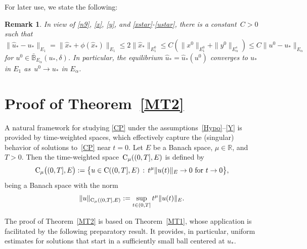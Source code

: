 \documentclass[reqno,11pt]{amsart}
\numberwithin{equation}{section}
\newcommand{\R}{\mathbb{R}}
\newtheorem{rem}[thm]{Remark}
\theoremstyle{remark}
\begin{document}
For later use, we state the  following:



 \begin{rem}\label{R2} In view of  \eqref{n9}, \eqref{x},  \eqref{y}, and \eqref{xstar}-\eqref{ustar},  there is a constant~$C>0$ such that
 \begin{equation*}
 \|\hat u_*-u_*\|_{E_1}=\|\hat x_*+\phi(\hat x_*)\|_{E_1}\leq 2\|\hat x_*\|_{E_1^0}\leq C(\|x^0\|_{E_1^0}+\|y^0\|_{E_\alpha^s}) \leq C\|u^0-u_*\|_{E_\alpha}
 \end{equation*}
for $u^0\in \bar{\mathbb{B}}_{E_\alpha}(u_*,\delta)$.
In particular, the equilibrium $\hat u_*=\hat u_*(u^0)$ converges to $u_*$ in $E_1$ as~$u^0\to u_*$ in $E_\alpha$.
 \end{rem}
 
 
 
 
 
\section{Proof of Theorem~\ref{MT2}}\label{Sec:3}


A natural framework for studying \eqref{CP} under the assumptions~\eqref{Hypo}--\eqref{Y}  
is provided by time-weighted spaces, which effectively capture the (singular) behavior of  
solutions to~\eqref{CP} near $t=0$.
Let  $E$ be a Banach space,  $\mu\in\R$, and~${T>0}$. Then the time-weighted space~${\rm C}_\mu((0,T],E)$ is defined by
\begin{equation}\label{tws}
 {\rm C}_\mu\big((0,T],E\big):=\big\{u\in {\rm C}((0,T], E)\,:\, \text{$t^\mu  \|u(t)\|_E\to 0$ for $t\to0$}\big\},
 \end{equation}
being a Banach space with the norm
\[
\|u\|_{{\rm C}_\mu((0,T],E)}:=\sup_{t\in(0,T]}t^\mu\|u(t)\|_E. 
\]

The proof of Theorem~\ref{MT2} is based on Theorem~\ref{MT1}, whose application is facilitated by  the following preparatory result. It provides, in particular, uniform estimates for solutions that start in a sufficiently small ball centered at $u_*$. 
\end{document}
